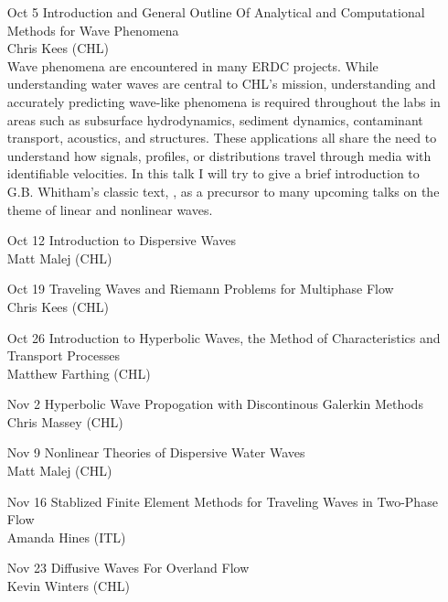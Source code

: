 \documentclass[12]{article}
\begin{document}
\begin{enumerate}

\item[Oct 5] Introduction and General Outline Of Analytical and
  Computational Methods for Wave Phenomena\\ Chris Kees (CHL)\\ Wave
  phenomena are encountered in many ERDC projects. While understanding
  water waves are central to CHL's mission, understanding and
  accurately predicting wave-like phenomena is required throughout the
  labs in areas such as subsurface hydrodynamics, sediment dynamics,
  contaminant transport, acoustics, and structures.  These
  applications all share the need to understand how signals, profiles,
  or distributions travel through media with identifiable
  velocities. In this talk I will try to give a brief introduction to
  G.B. Whitham's classic text, ,
  as a precursor to many upcoming talks on the theme of linear and
  nonlinear waves.

\item[Oct 12] Introduction to Dispersive Waves\\
Matt Malej (CHL)\\

\item[Oct 19] Traveling Waves and Riemann Problems for Multiphase Flow\\
Chris Kees (CHL)\\

\item[Oct 26] Introduction to Hyperbolic Waves, the Method of Characteristics and Transport Processes\\
Matthew Farthing (CHL)\\

\item[Nov 2] Hyperbolic Wave Propogation with Discontinous Galerkin Methods\\
Chris Massey (CHL)\\

\item[Nov 9] Nonlinear Theories of Dispersive Water Waves\\
Matt Malej (CHL)\\

\item[Nov 16] Stablized Finite Element Methods for Traveling Waves in Two-Phase Flow\\
Amanda Hines (ITL)\\

\item[Nov 23] Diffusive Waves For Overland Flow\\
Kevin Winters (CHL)\\

\end{enumerate}
\end{document}
